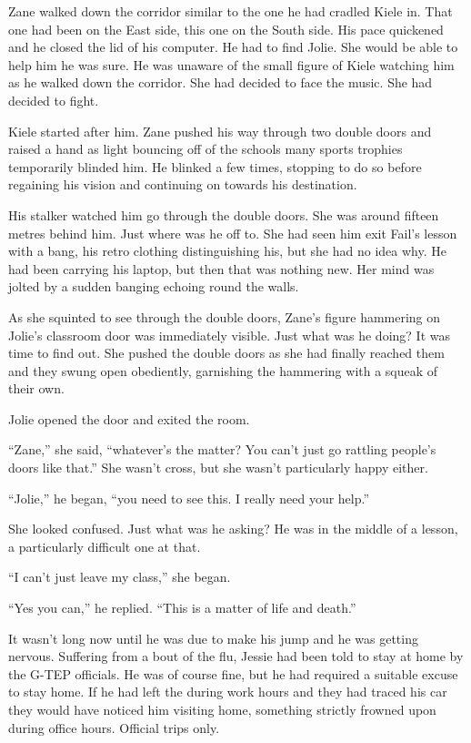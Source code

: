Zane walked down the corridor similar to the one he had cradled Kiele in.  That one had been on the East side, this one on the South side.  His pace quickened and he closed the lid of his computer.  He had to find Jolie.  She would be able to help him he was sure.  He was unaware of the small figure of Kiele watching him as he walked down the corridor.  She had decided to face the music.  She had decided to fight.  

Kiele started after him.  Zane pushed his way through two double doors and raised a hand as light bouncing off of the schools many sports trophies temporarily blinded him.  He blinked a few times, stopping to do so before regaining his vision and continuing on towards his destination.  

His stalker watched him go through the double doors.  She was around fifteen metres behind him.  Just where was he off to.  She had seen him exit Fail's lesson with a bang, his retro clothing distinguishing his, but she had no idea why.  He had been carrying his laptop, but then that was nothing new.  Her mind was jolted by a sudden banging echoing round the walls.

As she squinted to see through the double doors, Zane's figure hammering on Jolie's classroom door was immediately visible.  Just what was he doing?  It was time to find out.  She pushed the double doors as she had finally reached them and they swung open obediently, garnishing the hammering with a squeak of their own.

Jolie opened the door and exited the room.

``Zane,'' she said, ``whatever's the matter?  You can't just go rattling people's doors like that.''  She wasn't cross, but she wasn't particularly happy either.

``Jolie,'' he began, ``you need to see this.  I really need your help.''

She looked confused.  Just what was he asking?  He was in the middle of a lesson, a particularly difficult one at that.

``I can't just leave my class,'' she began.

``Yes you can,'' he replied.  ``This is a matter of life and death.''



\thoughtbreak



It wasn't long now until he was due to make his jump and he was getting nervous.  Suffering from a bout of the flu, Jessie had been told to stay at home by the G-TEP officials.  He was of course fine, but he had required a suitable excuse to stay home.  If he had left the during work hours and they had traced his car they would have noticed him visiting home, something strictly frowned upon during office hours.  Official trips only.

